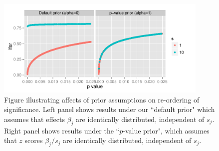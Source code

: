 \documentclass[11pt]{article}
\newtheorem{result}{Result}
\def\lfdr{\textit{lfdr}}
\def\lfsr{\textit{lfsr}}
\def\bhat{\hat{\beta}}
\def\qvalue{{\tt qvalue}\xspace}
\begin{document}

 




\begin{figure}
\centering\includegraphics[width=4in]{../analysis/figure/make_GOODPOOR_figs.Rmd/lfsr_vs_pval_GOODPOOR-1.pdf}
\caption{Figure illustrating affects of prior assumptions on re-ordering of significance. Left panel shows results under our ``default prior" which assumes that effects $\beta_j$ are identically distributed, independent of $s_j$. Right panel shows results under the ``$p$-value prior", which assumes that $z$ scores $\beta_j/s_j$ are identically distributed, independent of $s_j$.} \label{fig:lfsr_pval}
\end{figure}
\end{document}
